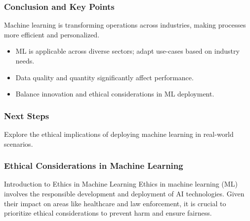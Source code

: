 \documentclass[aspectratio=169]{beamer}
\begin{document}
\begin{frame}[fragile]
    \frametitle{Conclusion and Key Points}
    Machine learning is transforming operations across industries, making processes more efficient and personalized. 

    \begin{itemize}
        \item ML is applicable across diverse sectors; adapt use-cases based on industry needs.
        \item Data quality and quantity significantly affect performance.
        \item Balance innovation and ethical considerations in ML deployment.
    \end{itemize}
\end{frame}

\begin{frame}[fragile]
    \frametitle{Next Steps}
    Explore the ethical implications of deploying machine learning in real-world scenarios.
\end{frame}

\begin{frame}[fragile]
    \frametitle{Ethical Considerations in Machine Learning}
    \begin{block}{Introduction to Ethics in Machine Learning}
        Ethics in machine learning (ML) involves the responsible development and deployment of AI technologies. Given their impact on areas like healthcare and law enforcement, it is crucial to prioritize ethical considerations to prevent harm and ensure fairness.
    \end{block}
\end{frame}
\end{document}
